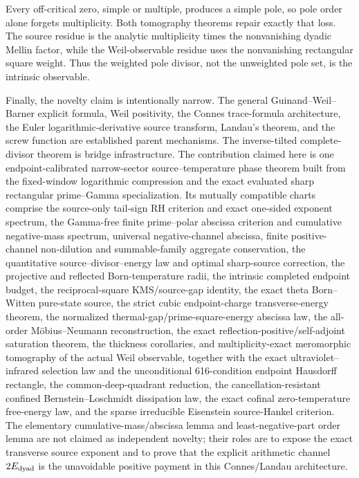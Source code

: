 \documentclass[11pt]{article}
\begin{document}
Every off-critical zero, simple or multiple, produces a simple pole, so pole order alone forgets
multiplicity.  Both tomography theorems repair exactly that loss.  The source residue is the
analytic multiplicity times the nonvanishing dyadic Mellin factor, while the Weil-observable
residue uses the nonvanishing rectangular square weight.  Thus the weighted pole divisor, not the
unweighted pole set, is the intrinsic observable.

\begin{sloppypar}
Finally, the novelty claim is intentionally narrow.  The general Guinand--Weil--Barner explicit
formula, Weil positivity, the Connes trace-formula
architecture, the Euler logarithmic-derivative source transform, Landau's theorem, and the screw
function are established parent mechanisms.  The inverse-tilted complete-divisor theorem is
bridge infrastructure.  The contribution claimed here is one endpoint-calibrated narrow-sector
source--temperature phase theorem built from the fixed-window logarithmic compression and the
exact evaluated sharp
rectangular prime--Gamma specialization.  Its mutually compatible charts comprise the source-only
tail-sign RH criterion and exact one-sided exponent spectrum, the Gamma-free finite prime--polar
abscissa criterion and cumulative negative-mass spectrum, universal negative-channel abscissa,
finite positive-channel non-dilution and summable-family aggregate conservation, the quantitative
source--divisor--energy law and optimal sharp-source correction, the projective and reflected
Born-temperature radii, the intrinsic completed endpoint budget, the reciprocal-square
KMS/source-gap identity, the exact theta Born--Witten pure-state source, the strict
cubic endpoint-charge transverse-energy theorem, the normalized thermal-gap/prime-square-energy
abscissa law, the all-order M\"obius--Neumann reconstruction, the exact
reflection-positive/self-adjoint saturation theorem, the thickness corollaries, and
multiplicity-exact meromorphic tomography of the actual Weil observable, together with the exact
ultraviolet--infrared selection law and the unconditional 616-condition endpoint Hausdorff
rectangle, the common-deep-quadrant reduction, the cancellation-resistant confined
Bernstein--Loschmidt dissipation law, the exact cofinal zero-temperature free-energy law, and the sparse
irreducible Eisenstein source-Hankel criterion.  The elementary
cumulative-mass/abscissa lemma and least-negative-part order lemma are not claimed as independent
novelty; their roles are to expose the exact transverse source exponent and to prove that
the explicit arithmetic channel $2E_{\rm dyad}$ is the unavoidable positive payment in this Connes/Landau
architecture.
\end{sloppypar}
\end{document}
